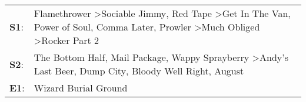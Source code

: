 \begin{supertabular}{p{0.03\textwidth}p{0.92\textwidth}}
 \textbf{S1}:  &  Flamethrower\textsuperscript{} \textgreater \enspace Sociable Jimmy\textsuperscript{}, \enspace Red Tape\textsuperscript{} \textgreater \enspace Get In The Van\textsuperscript{}, \enspace Power of Soul\textsuperscript{}, \enspace Comma Later\textsuperscript{}, \enspace Prowler\textsuperscript{} \textgreater \enspace Much Obliged\textsuperscript{} \textgreater \enspace Rocker Part 2\textsuperscript{}  \enspace  \\
 \textbf{S2}:  &                                                                                                             The Bottom Half\textsuperscript{}, \enspace Mail Package\textsuperscript{}, \enspace Wappy Sprayberry\textsuperscript{} \textgreater \enspace Andy's Last Beer\textsuperscript{}, \enspace Dump City\textsuperscript{}, \enspace Bloody Well Right\textsuperscript{}, \enspace August\textsuperscript{}  \enspace  \\
 \textbf{E1}:  &                                                                                                                                                                                                                                                                                                                                                                              Wizard Burial Ground\textsuperscript{}  \enspace  \\
\end{supertabular}
